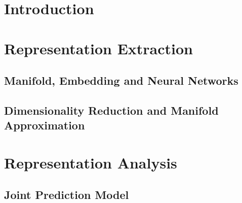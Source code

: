 \section{Introduction}
\lorem

\section{Representation Extraction}
\lorem

\subsection{Manifold, Embedding and Neural Networks}
\lorem

\subsection{Dimensionality Reduction and Manifold Approximation}
\lorem

\section{Representation Analysis}
\lorem

\subsection{Joint Prediction Model}
\lorem

